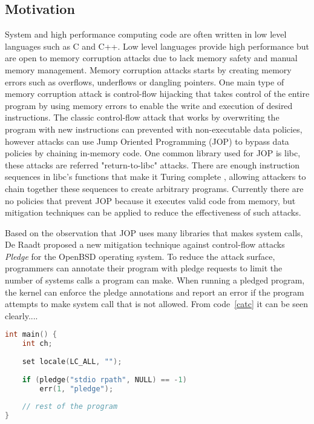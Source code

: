 \documentclass{article}
\begin{document}
\subsection{Motivation}

System and high performance computing code are often written in low level languages such as C and C++. Low level languages provide high performance but are open to memory corruption attacks due to lack memory safety and manual memory management. Memory corruption attacks \cite{Szekeres_2013} starts by creating memory errors such as overflows, underflows or dangling pointers. One main type of memory corruption attack is control-flow hijacking that takes control of the entire program by using memory errors to enable the write and execution of desired instructions. The classic control-flow attack that works by overwriting the program with new instructions can prevented with non-executable data policies, however attacks can use Jump Oriented Programming (JOP) to bypass data policies by chaining in-memory code. One common library used for JOP is libc, these attacks are referred "return-to-libc" attacks. There are enough instruction sequences in libc's functions that make it Turing complete \cite{Tran_2011}, allowing attackers to chain together these sequences to create arbitrary programs. Currently there are no policies that prevent JOP because it executes valid code from memory, but mitigation techniques \cite{Li_2010, Pappas_2012, pledge} can be applied to reduce the effectiveness of such attacks.

Based on the observation that JOP uses many libraries that makes system calls, De Raadt proposed a new mitigation technique against control-flow attacks \textit{Pledge}\cite{pledge} for the OpenBSD operating system. To reduce the attack surface, programmers can annotate their program with pledge\cite{pledge2} requests to limit the number of systems calls a program can make. When running a pledged program, the kernel can enforce the pledge annotations and report an error if the program attempts to make system call that is not allowed. From code~\ref{catc} it can be seen clearly....

\begin{lstlisting}[language=C,frame=single,caption=cat.c in OpenBSD,label=catc]
int main() {
    int ch;
    
    set locale(LC_ALL, "");
    
    if (pledge("stdio rpath", NULL) == -1)
        err(1, "pledge");
        
    // rest of the program
}
\end{lstlisting}
\end{document}
